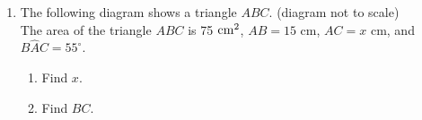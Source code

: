 \documentclass[12pt, twoside]{article}
\begin{document}
\begin{enumerate}
\item The following diagram shows a triangle $ABC$. \hfill (diagram not to scale)\\[0.5cm]
The area of the triangle $ABC$ is 75 $\rm{cm}^2$, $AB=15$ cm, $AC=x$ cm, and $B\hat{A}C = 55^\circ$.
  \begin{multicols}{2}
    \begin{enumerate}
      \item Find $x$.
      \item Find $BC$.
    \end{enumerate}
  \end{multicols}
  \vspace{1cm}

\end{enumerate}
\end{document}
